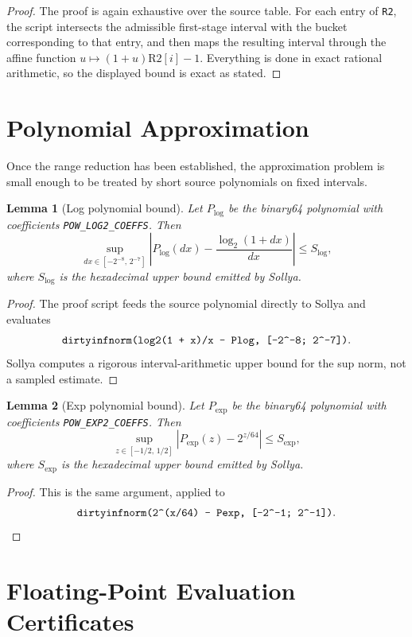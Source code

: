 \documentclass[11pt]{article}
\theoremstyle{plain}
\newtheorem{lemma}{Lemma}
\theoremstyle{remark}
\begin{document}
\begin{proof}
The proof is again exhaustive over the source table.  For each entry of
\texttt{R2}, the script intersects the admissible first-stage interval with
the bucket corresponding to that entry, and then maps the resulting interval
through the affine function $u \mapsto (1+u)\mathrm{R2}[i]-1$.  Everything is
done in exact rational arithmetic, so the displayed bound is exact as stated.
\end{proof}

\section{Polynomial Approximation}
\label{sec:poly}

Once the range reduction has been established, the approximation problem is
small enough to be treated by short source polynomials on fixed intervals.

\begin{lemma}[Log polynomial bound]
\label{lem:supnorm-log}
Let $P_{\!\log}$ be the binary64 polynomial with coefficients
\texttt{POW\_LOG2\_COEFFS}.  Then
\[
  \sup_{dx \in [-2^{-8},\,2^{-7}]}
  \left|
    P_{\!\log}(dx) - \frac{\log_2(1+dx)}{dx}
  \right|
  \leq S_{\log},
\]
where $S_{\log}$ is the hexadecimal upper bound emitted by Sollya.
\end{lemma}

\begin{proof}
The proof script feeds the source polynomial directly to Sollya and evaluates
\[
  \texttt{dirtyinfnorm(log2(1 + x)/x - Plog, [-2\string^-8; 2\string^-7])}.
\]
Sollya computes a rigorous interval-arithmetic upper bound for the sup norm,
not a sampled estimate.
\end{proof}

\begin{lemma}[Exp polynomial bound]
\label{lem:supnorm-exp}
Let $P_{\!\exp}$ be the binary64 polynomial with coefficients
\texttt{POW\_EXP2\_COEFFS}.  Then
\[
  \sup_{z \in [-1/2,\,1/2]}
  |P_{\!\exp}(z) - 2^{z/64}|
  \leq S_{\exp},
\]
where $S_{\exp}$ is the hexadecimal upper bound emitted by Sollya.
\end{lemma}

\begin{proof}
This is the same argument, applied to
\[
  \texttt{dirtyinfnorm(2\string^(x/64) - Pexp, [-2\string^-1; 2\string^-1])}.
\]
\end{proof}

\section{Floating-Point Evaluation Certificates}
\label{sec:gappa}
\end{document}
